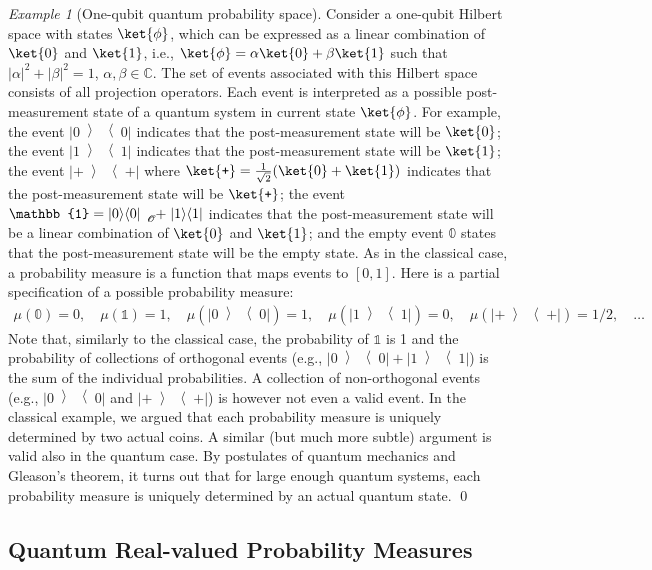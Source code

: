 \documentclass{article}
\theoremstyle{remark}
\newtheorem{example}{Example}
\newcommand{\ps}{\texttt{+}}
\def\C{{\mathbb{C}}}
\newcommand{\op}[2]{\ensuremath{\left\vert{#1}\middle\rangle\middle\langle{#2}\right\vert}}
\newcommand{\proj}[1]{\op{#1}{#1}}
\begin{document}
\begin{example}[One-qubit quantum probability space] Consider
a one-qubit Hilbert space with states $\ket{\phi}$, which can be
expressed as a linear combination of $\ket{0}$ and $\ket{1}$, i.e.,
$\ket{\phi}=\alpha\ket{0}+\beta\ket{1}$ such that $|\alpha|^{2}+|\beta|^{2}=1$,
$\alpha,\beta\in\C$. The set of events associated with this Hilbert
space consists of all projection operators. Each event is interpreted
as a possible post-measurement state of a quantum system in current
state $\ket{\phi}$. For example, the event $\proj{0}$ indicates
that the post-measurement state will be $\ket{0}$; the event $\proj{1}$
indicates that the post-measurement state will be $\ket{1}$; the
event $\proj{\ps}$ where $\ket{\ps}=\frac{1}{\sqrt{2}}(\ket{0}+\ket{1})$
indicates that the post-measurement state will be $\ket{\ps}$; the
event $\mathbb{1}=\proj{0}\tensor*[_{\mathscr{O}}]{+}{}\proj{1}$
indicates that the post-measurement state will be a linear combination
of $\ket{0}$ and $\ket{1}$; and the empty event $\mathbb{0}$ states
that the post-measurement state will be the empty state. As in the
classical case, a probability measure is a function that maps events
to $[0,1]$. Here is a partial specification of a possible probability
measure: 
\[
\begin{array}{rcl}
\mu\left(\mathbb{0}\right)=0,\quad\mu\left(\mathbb{1}\right)=1,\quad\mu\left(\proj{0}\right)=1,\quad\mu\left(\proj{1}\right)=0,\quad\mu\left(\proj{\ps}\right)=1/2,\quad\ldots\end{array}
\]
Note that, similarly to the classical case, the probability of $\mathbb{1}$
is 1 and the probability of collections of orthogonal events (e.g.,
$\proj{0}+\proj{1}$) is the sum of the individual probabilities.
A collection of non-orthogonal events (e.g., $\proj{0}$ and $\proj{\ps}$)
is however not even a valid event. In the classical example, we argued
that each probability measure is uniquely determined by two actual
coins. A similar (but much more subtle) argument is valid also in
the quantum case. By postulates of quantum mechanics and Gleason's
theorem, it turns out that for large enough quantum systems, each
probability measure is uniquely determined by an actual quantum state.
\qed\end{example}



\subsection{Quantum Real-valued Probability Measures}
\end{document}
